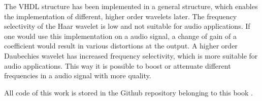 \begin{refsection}
The VHDL structure has been implemented in a general structure, which enables the implementation of different, higher order wavelets later. 
The frequency selectivity of the Haar wavelet is low and not suitable for audio applications.
If one would use this implementation on a audio signal, a change of gain of a coefficient would result in various distortions at the output. 
A higher order Daubechies wavelet has increased frequency selectivity, which is more suitable for audio applications.
This way it is possible to boost or attenuate different frequencies in a audio signal with more quality. 

All code of this work is stored in the Github repository belonging to this book \cite{fpga:gitrepo-wavelets}.

\printbibliography[heading=subbibliography]
\end{refsection}
